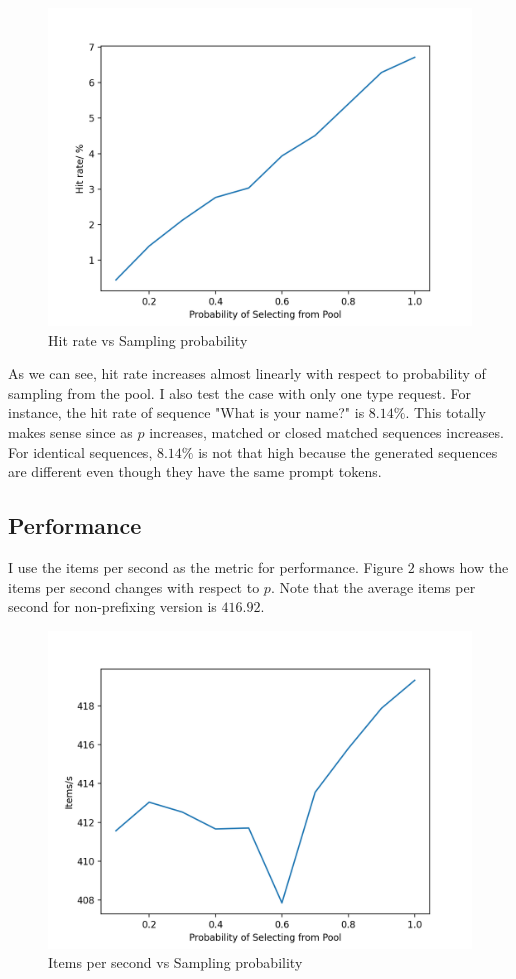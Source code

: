 \documentclass{article}
\begin{document}
\begin{figure}[h]
    \includegraphics[scale = 0.4]{Hit_rate.png}
    \centering
    \caption{Hit rate vs Sampling probability}
    \label{fig:}
\end{figure}

As we can see, hit rate increases almost linearly with respect to probability of sampling from the pool. I also test the case with only one type request. For instance, the hit rate of sequence
"What is your name?" is $8.14\%$. This totally makes sense since as $p$ increases, matched or closed matched sequences increases. For identical sequences, $8.14\%$ is not that high because the generated sequences are different even
though they have the same prompt tokens.

\subsection{Performance}
I use the items per second as the metric for performance. Figure $2$ shows how the items per second changes with respect to $p$. Note that the average items per second for non-prefixing version is $416.92$.
\begin{figure}[h]
    \includegraphics[scale = 0.4]{Performance.png}
    \centering
    \caption{Items per second vs Sampling probability}
    \label{fig:}
\end{figure}
\end{document}
